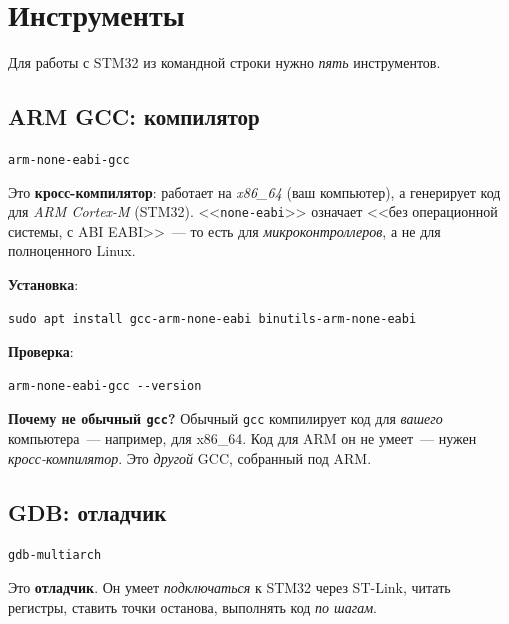 \section{Инструменты}
\label{sec:flashing-tools}

Для работы с STM32 из командной строки нужно
\emph{пять} инструментов.

\subsection{ARM GCC: компилятор}

\begin{center}
\texttt{arm-none-eabi-gcc}
\end{center}

Это \textbf{кросс-компилятор}: работает на \emph{x86\_64} (ваш
компьютер), а генерирует код для \emph{ARM Cortex-M}
(STM32). <<\texttt{none-eabi}>> означает <<без операционной
системы, с ABI EABI>>~--- то есть для \emph{микроконтроллеров},
а не для полноценного Linux.

\textbf{Установка}:

\begin{verbatim}
sudo apt install gcc-arm-none-eabi binutils-arm-none-eabi
\end{verbatim}

\textbf{Проверка}:

\begin{verbatim}
arm-none-eabi-gcc --version
\end{verbatim}

\begin{keybox}
\textbf{Почему не обычный \texttt{gcc}?} Обычный \texttt{gcc}
компилирует код для \emph{вашего} компьютера~--- например,
для x86\_64. Код для ARM он не умеет~--- нужен
\emph{кросс-компилятор}. Это \emph{другой} GCC, собранный
под ARM.
\end{keybox}

\subsection{GDB: отладчик}

\begin{center}
\texttt{gdb-multiarch}
\end{center}

Это \textbf{отладчик}. Он умеет \emph{подключаться} к
STM32 через ST-Link, читать регистры, ставить точки
останова, выполнять код \emph{по шагам}.

